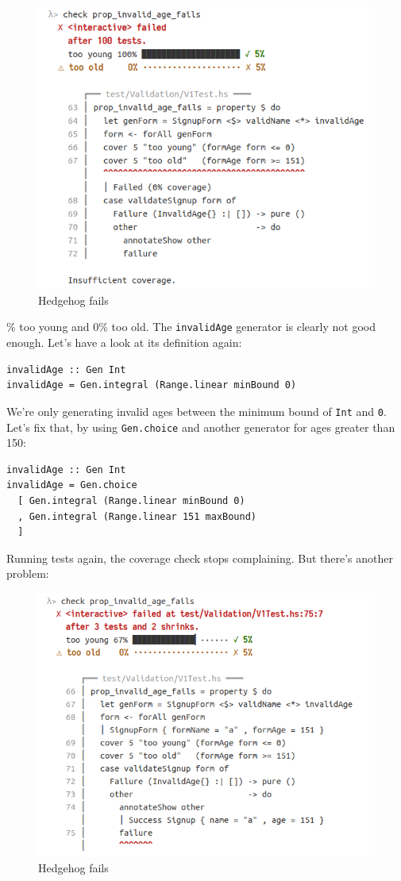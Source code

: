 \begin{figure}[htbp]
 \centering
 \includegraphics[width=.95\linewidth]{./pics/hedgehog1.png}
 \caption{Hedgehog fails}
 \label{fig:hedgehog1}
\end{figure}
\% too young and 0\% too old. The \texttt{invalidAge} generator is
clearly not good enough. Let's have a look at its definition again:

\begin{verbatim}
invalidAge :: Gen Int
invalidAge = Gen.integral (Range.linear minBound 0)
\end{verbatim}
We're only generating invalid ages between the minimum bound of
\texttt{Int} and \texttt{0}. Let's fix that, by using
\texttt{Gen.choice} and another generator for ages greater than 150:

\begin{verbatim}
invalidAge :: Gen Int
invalidAge = Gen.choice
  [ Gen.integral (Range.linear minBound 0)
  , Gen.integral (Range.linear 151 maxBound)
  ]
\end{verbatim}
Running tests again, the coverage check stops complaining. But there's
another problem:
\begin{figure}[htbp]
 \centering
 \includegraphics[width=.95\linewidth]{./pics/hedgehog2.png}
 \caption{Hedgehog fails}
 \label{fig:hedgehog2}
\end{figure}


